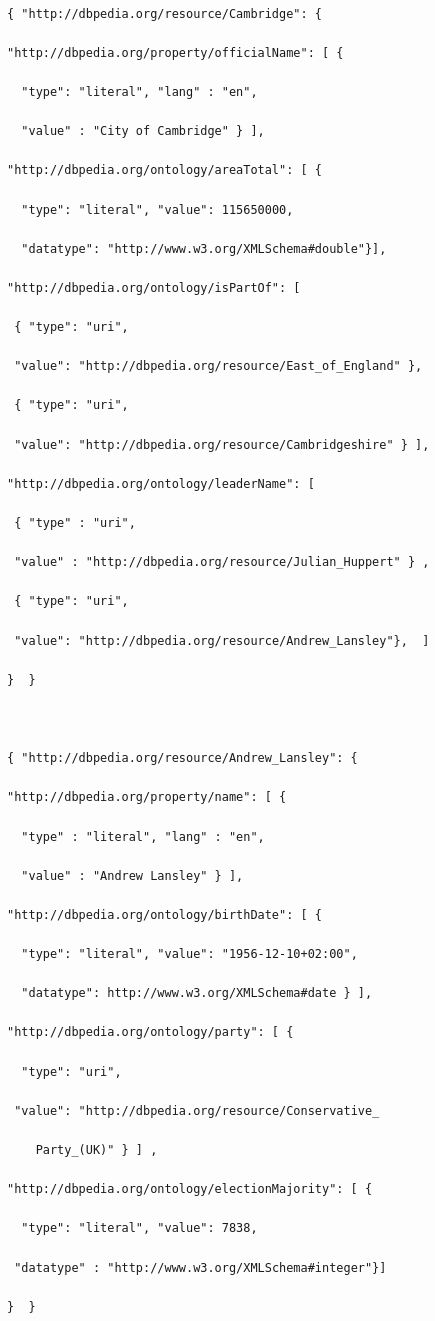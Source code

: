       \begin{verbatim}

{ "http://dbpedia.org/resource/Cambridge": {

"http://dbpedia.org/property/officialName": [ {

  "type": "literal", "lang" : "en",

  "value" : "City of Cambridge" } ],

"http://dbpedia.org/ontology/areaTotal": [ {

  "type": "literal", "value": 115650000,

  "datatype": "http://www.w3.org/XMLSchema#double"}],

"http://dbpedia.org/ontology/isPartOf": [

 { "type": "uri",

 "value": "http://dbpedia.org/resource/East_of_England" },

 { "type": "uri",

 "value": "http://dbpedia.org/resource/Cambridgeshire" } ],

"http://dbpedia.org/ontology/leaderName": [

 { "type" : "uri",

 "value" : "http://dbpedia.org/resource/Julian_Huppert" } ,

 { "type": "uri",

 "value": "http://dbpedia.org/resource/Andrew_Lansley"},  ]

}  }



{ "http://dbpedia.org/resource/Andrew_Lansley": {

"http://dbpedia.org/property/name": [ {

  "type" : "literal", "lang" : "en",

  "value" : "Andrew Lansley" } ],

"http://dbpedia.org/ontology/birthDate": [ {

  "type": "literal", "value": "1956-12-10+02:00",

  "datatype": http://www.w3.org/XMLSchema#date } ],

"http://dbpedia.org/ontology/party": [ {

  "type": "uri",

 "value": "http://dbpedia.org/resource/Conservative_

    Party_(UK)" } ] ,

"http://dbpedia.org/ontology/electionMajority": [ {

  "type": "literal", "value": 7838,

 "datatype" : "http://www.w3.org/XMLSchema#integer"}]

}  }

\end{verbatim}



